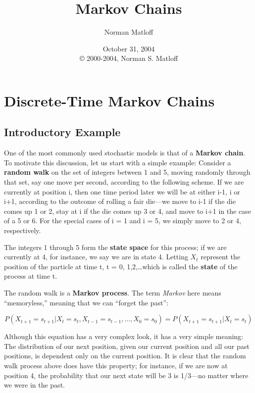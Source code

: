 \documentclass[11pt]{article}
\begin{document}
\title{Markov Chains}

\author{Norman Matloff }

\date{October 31, 2004 \\   
\copyright{} 2000-2004, Norman S. Matloff}   

\maketitle 

\tableofcontents{}

\newpage

\section{Discrete-Time Markov Chains}

\subsection{Introductory Example}

One of the most commonly used stochastic models is that of a
\textbf{Markov chain}. To motivate this discussion, let us start with a
simple example: Consider a \textbf{random walk} on the set of integers
between 1 and 5, moving randomly through that set, say one move per
second, according to the following scheme.  If we are currently at
position i, then one time period later we will be at either i-1, i or
i+1, according to the outcome of rolling a fair die---we move to i-1 if
the die comes up 1 or 2, stay at i if the die comes up 3 or 4, and move
to i+1 in the case of a 5 or 6. For the special cases of i = 1 and i =
5, we simply move to 2 or 4, respectively.

The integers 1 through 5 form the \textbf{state space} for this process;
if we are currently at 4, for instance, we say we are in state 4.
Letting $X_{t}$ represent the position of the particle at time t, t =
0, 1,2,\ldots{}which is called the \textbf{state} of the process at time
t.

The random walk is a \textbf{Markov process}. The term \textit{Markov} here
means ``memoryless,'' meaning that we can ``forget the past'':


\begin{equation}
P(X_{t+1}=s_{t+1}|X_{t}=s_{t},X_{t-1}=s_{t-1},\ldots ,X_{0}=s_{0})=P(X_{t+1}=s_{t+1}|X_{t}=s_{t})
\end{equation}


Although this equation has a very complex look, it has a very simple meaning:
The distribution of our next position, given our current position and all our
past positions, is dependent only on the current position. It is clear that
the random walk process above does have this property; for instance, if we are
now at position 4, the probability that our next state will be 3 is 1/3---no
matter where we were in the past.
\end{document}
